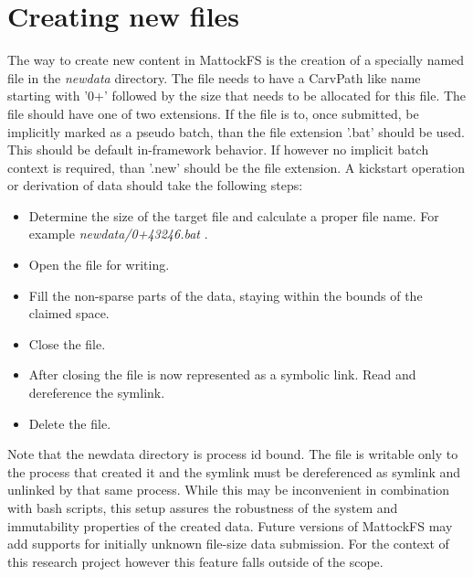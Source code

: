 \section{Creating new files}
The way to create new content in MattockFS is the creation of a specially named file in the \emph{newdata} directory. The file needs to have a CarvPath like name starting with '0+' followed by the size that needs to be allocated for this file. The file should have one of two extensions. If the file is to, once submitted, be implicitly marked as a pseudo batch, than the file extension '.bat' should be used. This should be default in-framework behavior. If however no implicit  batch context is required, than '.new' should be the file extension. A kickstart operation or derivation of data should take the following steps:
\begin{itemize}
\item Determine the size of the target file and calculate a proper file name. For example \emph{newdata/0+43246.bat} .
\item Open the file for writing.
\item Fill the non-sparse parts of the data, staying within the bounds of the claimed space.
\item Close the file.
\item After closing the file is now represented as a symbolic link. Read and dereference the symlink.
\item Delete the file.
\end{itemize} 
Note that the newdata directory is process id bound. The file is writable only to the process that created it and the symlink must be dereferenced as symlink and unlinked by that same process. While this may be inconvenient in combination with bash scripts, this setup assures the robustness of the system and immutability properties of the created data. Future versions of MattockFS may add supports for initially unknown file-size data submission. For the context of this research project however this feature falls outside of the scope.

